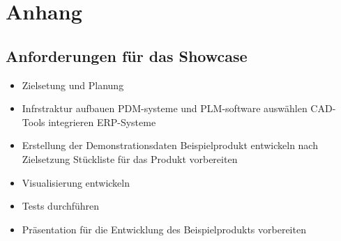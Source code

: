 \documentclass[a4paper, 12pt]{scrartcl}
\begin{document}
	\section{Anhang}
	
	
	\subsection{Anforderungen für das Showcase}
	\begin{itemize}
		\item Zielsetung und Planung
		\item Infrstraktur aufbauen
		\subitem PDM-systeme und PLM-software auswählen
		\subitem CAD-Tools integrieren
		\subitem ERP-Systeme 
		\item Erstellung der Demonstrationsdaten
		\subitem Beispielprodukt entwickeln nach Zielsetzung
		\subitem Stückliste für das Produkt vorbereiten
		\item Visualisierung entwickeln
		\item Tests durchführen
		\item Präsentation für die Entwicklung des Beispielprodukts vorbereiten 
	\end{itemize}
\end{document}
